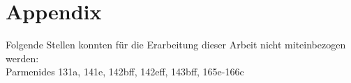 \documentclass[12pt]{article}
\newcommand*{\zitatblock}[1]{%
    \begin{quote}
    \fontsize{10}{12}\selectfont
    \setlength{\parskip}{1.0em}
    #1
    \end{quote}
}
\begin{document}
\section{Appendix}
Folgende Stellen konnten für die Erarbeitung dieser Arbeit nicht miteinbezogen werden:\\
Parmenides 131a, 141e, 142bff, 142eff, 143bff, 165e-166c\\
\end{document}
